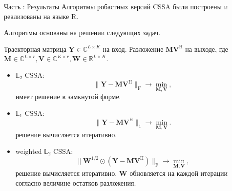 \documentclass[10pt, ucs, notheorems, handout]{beamer}
\newcommand{\RomanNumeralCaps}[1]
{\MakeUppercase{\romannumeral #1}}
\begin{document}
\begin{frame}{Часть \RomanNumeralCaps{1}: Результаты}
	Алгоритмы робастных версий CSSA были построены и реализованы на языке R.

	\vspace{1em}
Алгоритмы основаны на решении следующих задач.

	Траекторная матрица $\mathbf{Y} \in \mathbb{C}^{L\times K}$ на вход.
    Разложение $\mathbf{M}\mathbf{V}^{\mathrm{H}}$ на выходе,
	где $\mathbf{M} \in \mathbb{C}^{L\times r}, \mathbf{V} \in \mathbb{C}^{K\times r}, \mathbf{W} \in \mathbb{R}^{L\times K}$.\\
	\vspace{1em}
	\begin{itemize}
		\item $\mathbb{L}_2$ CSSA:
		$$ \|\mathbf{Y}-\mathbf{M}\mathbf{V}^{\mathrm{H}}\|_\mathrm{F} \longrightarrow \min_{\mathbf{M},\mathbf{V}},$$
		имеет решение в замкнутой форме.
		\item $\mathbb{L}_1$ CSSA:
		$$\|\mathbf{Y}-\mathbf{M}\mathbf{V}^{\mathrm{H}}\|_1 \longrightarrow \min_{\mathbf{M},\mathbf{V}}.$$
		решение вычисляется итеративно.
		\item weighted $\mathbb{L}_2$ CSSA:
		$$\|\mathbf{W}^{1/2}\odot(\mathbf{Y}-\mathbf{M}\mathbf{V}^{\mathrm{H}})\|_\mathrm{F} \longrightarrow \min_{\mathbf{M},\mathbf{V}},$$
		решение вычисляется итеративно, $\mathbf{W}$ обновляется на каждой итерации согласно величине остатков разложения.
	\end{itemize}
	
\end{frame}
\end{document}
